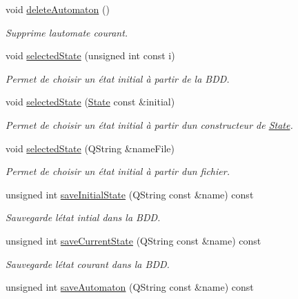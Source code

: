 \begin{DoxyCompactItemize}
void \mbox{\hyperlink{class_automata_manager_a94116e7f2e3ef1ba3d052569fe9dac6a}{delete\+Automaton}} ()
\begin{DoxyCompactList}\small\item\em Supprime l\textquotesingle{}automate courant. \end{DoxyCompactList}\item 
void \mbox{\hyperlink{class_automata_manager_a8ed02429103fb56a90f53128e709124b}{selected\+State}} (unsigned int const i)
\begin{DoxyCompactList}\small\item\em Permet de choisir un état initial à partir de la B\+DD. \end{DoxyCompactList}\item 
void \mbox{\hyperlink{class_automata_manager_a9db032e421b5e3a1441df2741a34c278}{selected\+State}} (\mbox{\hyperlink{class_state}{State}} const \&initial)
\begin{DoxyCompactList}\small\item\em Permet de choisir un état initial à partir d\textquotesingle{}un constructeur de \mbox{\hyperlink{class_state}{State}}. \end{DoxyCompactList}\item 
void \mbox{\hyperlink{class_automata_manager_a64081b6c56600865d3120b1ae1f0db93}{selected\+State}} (Q\+String \&name\+File)
\begin{DoxyCompactList}\small\item\em Permet de choisir un état initial à partir d\textquotesingle{}un fichier. \end{DoxyCompactList}\item 
unsigned int \mbox{\hyperlink{class_automata_manager_adf2b19b01cf0e63a0037ab13a8fbd428}{save\+Initial\+State}} (Q\+String const \&name) const
\begin{DoxyCompactList}\small\item\em Sauvegarde l\textquotesingle{}état intial dans la B\+DD. \end{DoxyCompactList}\item 
unsigned int \mbox{\hyperlink{class_automata_manager_ade711c622353cbdad0f33d5813cbbcae}{save\+Current\+State}} (Q\+String const \&name) const
\begin{DoxyCompactList}\small\item\em Sauvegarde l\textquotesingle{}état courant dans la B\+DD. \end{DoxyCompactList}\item 
unsigned int \mbox{\hyperlink{class_automata_manager_af35d1dbd73d340306477c923d385929a}{save\+Automaton}} (Q\+String const \&name) const

\end{DoxyCompactItemize}
